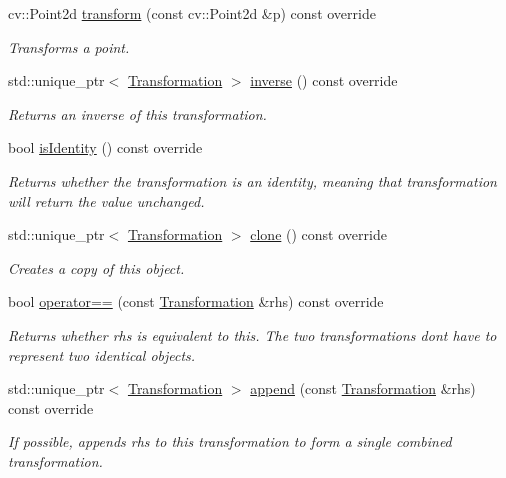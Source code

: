 \begin{DoxyCompactItemize}
cv\+::\+Point2d \hyperlink{structdg_1_1deepcore_1_1geometry_1_1_affine_transformation_ad616f03d3e0e6c45a694df24053b1b90}{transform} (const cv\+::\+Point2d \&p) const override
\begin{DoxyCompactList}\small\item\em Transforms a point. \end{DoxyCompactList}\item 
std\+::unique\+\_\+ptr$<$ \hyperlink{structdg_1_1deepcore_1_1geometry_1_1_transformation}{Transformation} $>$ \hyperlink{structdg_1_1deepcore_1_1geometry_1_1_affine_transformation_ac2ea1e7bd48e1c8be85d14b47d627d8e}{inverse} () const override
\begin{DoxyCompactList}\small\item\em Returns an inverse of this transformation. \end{DoxyCompactList}\item 
bool \hyperlink{structdg_1_1deepcore_1_1geometry_1_1_affine_transformation_a040c5bc4bf124ad593f07a8f95725b97}{is\+Identity} () const override
\begin{DoxyCompactList}\small\item\em Returns whether the transformation is an identity, meaning that transformation will return the value unchanged. \end{DoxyCompactList}\item 
std\+::unique\+\_\+ptr$<$ \hyperlink{structdg_1_1deepcore_1_1geometry_1_1_transformation}{Transformation} $>$ \hyperlink{structdg_1_1deepcore_1_1geometry_1_1_affine_transformation_a43fdfdf7290d667358b01ccb266bcaf6}{clone} () const override
\begin{DoxyCompactList}\small\item\em Creates a copy of this object. \end{DoxyCompactList}\item 
bool \hyperlink{structdg_1_1deepcore_1_1geometry_1_1_affine_transformation_aee20663f0c25d1278de0df2c37925cb5}{operator==} (const \hyperlink{structdg_1_1deepcore_1_1geometry_1_1_transformation}{Transformation} \&rhs) const override
\begin{DoxyCompactList}\small\item\em Returns whether {\ttfamily rhs} is equivalent to this. The two transformations don\textquotesingle{}t have to represent two identical objects. \end{DoxyCompactList}\item 
std\+::unique\+\_\+ptr$<$ \hyperlink{structdg_1_1deepcore_1_1geometry_1_1_transformation}{Transformation} $>$ \hyperlink{structdg_1_1deepcore_1_1geometry_1_1_affine_transformation_afb1469fc816b9113330095fc4a6c41ec}{append} (const \hyperlink{structdg_1_1deepcore_1_1geometry_1_1_transformation}{Transformation} \&rhs) const override
\begin{DoxyCompactList}\small\item\em If possible, appends {\ttfamily rhs} to this transformation to form a single combined transformation. \end{DoxyCompactList}\end{DoxyCompactItemize}
